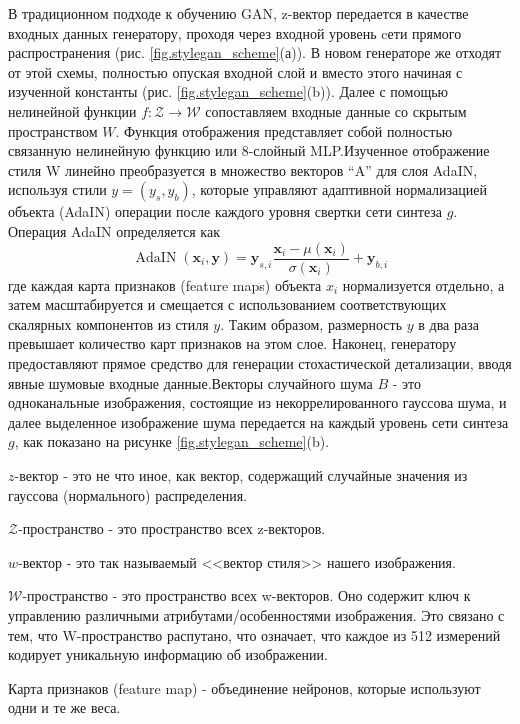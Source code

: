 В традиционном подходе к обучению GAN, z-вектор передается в качестве входных данных генератору, проходя через входной уровень cети прямого распространения (рис. {\color{blue} \ref{fig.stylegan_scheme}}(а)). В новом генераторе же отходят от этой схемы, полностью опуская входной слой и вместо этого начиная с изученной константы (рис. {\color{blue} \ref{fig.stylegan_scheme}}(b)). Далее с помощью нелинейной функции $f : \mathcal{Z} \rightarrow \mathcal{W}$ сопоставляем входные данные со скрытым пространством $W$. Функция отображения представляет собой полностью связанную нелинейную функцию или 8-слойный MLP.Изученное отображение стиля W линейно преобразуется в множество векторов “A” для слоя AdaIN, используя стили $y = (y_s, y_b)$, которые управляют адаптивной нормализацией объекта (AdaIN) операции после каждого уровня свертки сети синтеза $g$. Операция AdaIN определяется как
\begin{equation}
    \operatorname{AdaIN}\left(\mathbf{x}_{i}, \mathbf{y}\right)=\mathbf{y}_{s, i} \frac{\mathbf{x}_{i}-\mu\left(\mathbf{x}_{i}\right)}{\sigma\left(\mathbf{x}_{i}\right)}+\mathbf{y}_{b, i}
\end{equation}
где каждая карта признаков (feature maps) объекта $x_i$ нормализуется отдельно, а затем масштабируется и смещается с использованием соответствующих скалярных компонентов из стиля $y$. Таким образом, размерность $y$ в два раза превышает количество карт признаков на этом слое. Наконец, генератору предоставляют прямое средство для генерации стохастической детализации, вводя явные шумовые входные данные.Векторы случайного шума $B$ - это одноканальные изображения, состоящие из некоррелированного гауссова шума, и далее выделенное изображение шума передается на каждый уровень сети синтеза $g$, как показано на рисунке {\color{blue} \ref{fig.stylegan_scheme}}(b)\cite{StyleGAN}.

\begin{definition}
    $z$-вектор - это не что иное, как вектор, содержащий случайные значения из гауссова (нормального) распределения.
\end{definition}
\begin{definition}
    $\mathcal{Z}$-пространство - это пространство всех z-векторов.
\end{definition}
\begin{definition}
    $w$-вектор - это так называемый <<вектор стиля>> нашего изображения.
\end{definition}
\begin{definition}
    $\mathcal{W}$-пространство - это пространство всех w-векторов. Оно содержит ключ к управлению различными атрибутами/особенностями изображения. Это связано с тем, что W-пространство распутано, что означает, что каждое из 512 измерений кодирует уникальную информацию об изображении.
\end{definition}
\begin{definition}
    Карта признаков (feature map) - объединение нейронов, которые используют одни и те же веса.
\end{definition}

